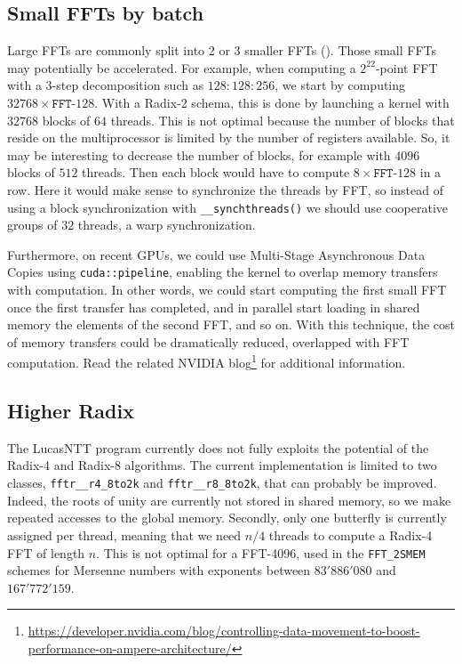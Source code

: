 \documentclass{article}
\begin{document}
\subsection{Small FFTs by batch}
Large FFTs are commonly split into 2 or 3 smaller FFTs (\cite{Bai89}). Those small FFTs may potentially be accelerated. For example, when computing a $2^{22}$-point FFT with a 3-step decomposition such as $128:128:256$, we start by computing $32768 \times \texttt{FFT-}128$. With a Radix-2 schema, this is done by launching a kernel with $32768$ blocks of $64$ threads. This is not optimal because the number of blocks that reside on the multiprocessor is limited by the number of registers available. So, it may be interesting to decrease the number of blocks, for example with $4096$ blocks of $512$ threads. Then each block would have to compute $8 \times \texttt{FFT-}128$ in a row. Here it would make sense to synchronize the threads by FFT, so instead of using a block synchronization with \texttt{\_\_synchthreads()} we should use cooperative groups of $32$ threads, a warp synchronization.

Furthermore, on recent GPUs, we could use Multi-Stage Asynchronous Data Copies using \texttt{cuda::pipeline}, enabling the kernel to overlap memory transfers with computation. In other words, we could start computing the first small FFT once the first transfer has completed, and in parallel start loading in shared memory the elements of the second FFT, and so on. With this technique, the cost of memory transfers could be dramatically reduced, overlapped with FFT computation. Read the related NVIDIA blog\footnote{\url{https://developer.nvidia.com/blog/controlling-data-movement-to-boost-performance-on-ampere-architecture/}} for additional information.

\subsection{Higher Radix}
The LucasNTT program currently does not fully exploits the potential of the Radix-4 and Radix-8 algorithms. The current implementation is limited to two classes, \texttt{fftr\_\_r4\_8to2k} and \texttt{fftr\_\_r8\_8to2k}, that can probably be improved. Indeed, the roots of unity are currently not stored in shared memory, so we make repeated accesses to the global memory. Secondly, only one butterfly is currently assigned per thread, meaning that we need $n/4$ threads to compute a Radix-4 FFT of length $n$. This is not optimal for a FFT-4096, used in the \texttt{FFT\_2SMEM} schemes for Mersenne numbers with exponents between $83'886'080$ and $167'772'159$. 
\end{document}
